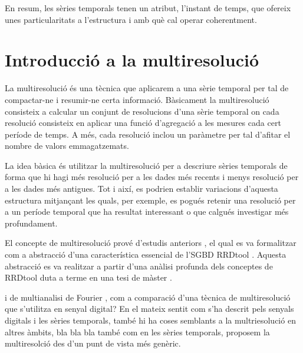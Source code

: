 En resum, les sèries temporals tenen un atribut, l'instant de
temps, que ofereix unes particularitats a l'estructura i amb què cal
operar coherentment.








\section{Introducció a la multiresolució}



\todo{}


La multiresolució és una tècnica que aplicarem a una sèrie temporal
per tal de compactar-ne i resumir-ne certa informació.  Bàsicament la
multiresolució consisteix a calcular un conjunt de resolucions d'una
sèrie temporal on cada resolució consisteix en aplicar una funció
d'agregació a les mesures cada cert període de temps. A més, cada
resolució inclou un paràmetre per tal d'afitar el nombre de valors
emmagatzemats.  

La idea bàsica és utilitzar la multiresolució per a descriure sèries
temporals de forma que hi hagi més resolució per a les dades més
recents i menys resolució per a les dades més antigues. Tot i així, es
podrien establir variacions d'aquesta estructura mitjançant les quals,
per exemple, es pogués retenir una resolució per a un període temporal
que ha resultat interessant o que calgués investigar més profundament.





El concepte de multiresolució prové d'estudis anteriors
\parencite{llusa12:ptd}, el qual es va formalitzar com a abstracció
d'una característica essencial de l'SGBD
RRDtool \parencite{rrdtool}. Aquesta abstracció es va realitzar a
partir d'una anàlisi profunda dels conceptes de RRDtool duta a terme
en una tesi de màster \parencite{llusa11:tfm}.







 i de multianalisi de Fourier  , com a comparació d'una tècnica de multiresolució que s'utilitza en senyal digital?
 En el mateix sentit com s'ha descrit pels senyals digitals i les sèries temporals, també hi ha coses semblants a la multriesolució en altres àmbits, bla bla bla  també com en les sèries temporals, proposem la multiresolció des d'un punt de vista més genèric.




